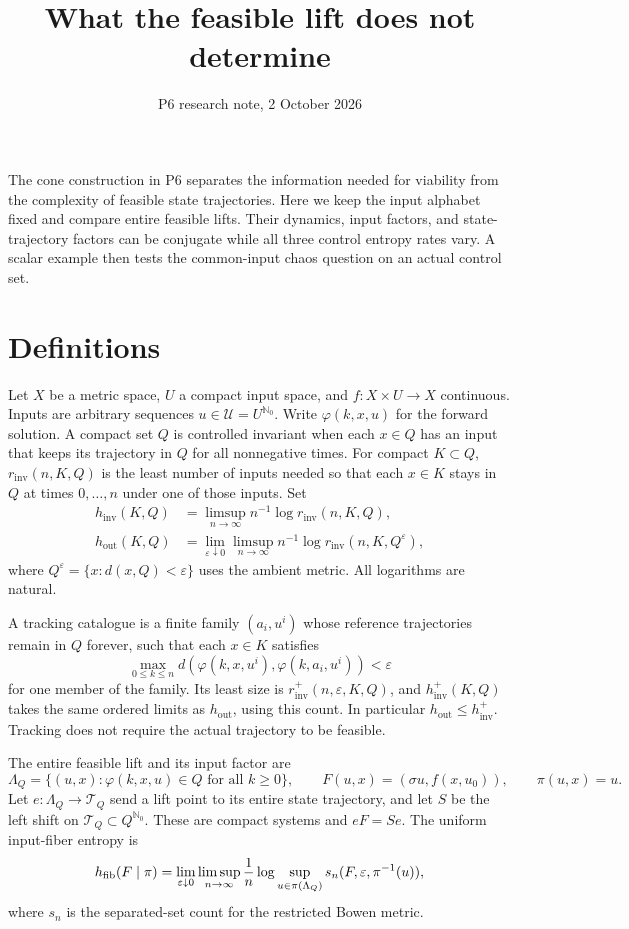 \documentclass[11pt,a4paper]{article}
\title{What the feasible lift does not determine}
\author{}
\date{P6 research note, 2 October 2026}
\theoremstyle{remark}
\newcommand{\U}{\mathcal U}
\newcommand{\T}{\mathcal T}
\newcommand{\hinv}{h_{\mathrm{inv}}}
\newcommand{\hout}{h_{\mathrm{out}}}
\newcommand{\htrack}{h_{\mathrm{inv}}^+}
\newcommand{\rinv}{r_{\mathrm{inv}}}
\begin{document}
\maketitle

The cone construction in P6 separates the information needed for viability
from the complexity of feasible state trajectories. Here we keep the input
alphabet fixed and compare entire feasible lifts. Their dynamics, input
factors, and state-trajectory factors can be conjugate while all three
control entropy rates vary. A scalar example then tests the common-input
chaos question on an actual control set.

\section{Definitions}

Let $X$ be a metric space, $U$ a compact input space, and
$f:X\times U\to X$ continuous. Inputs are arbitrary sequences
$u\in\U=U^{\mathbb N_0}$. Write $\varphi(k,x,u)$ for the forward solution.
A compact set $Q$ is controlled invariant when each $x\in Q$ has an input
that keeps its trajectory in $Q$ for all nonnegative times.
For compact $K\subset Q$, $\rinv(n,K,Q)$ is the least number of inputs
needed so that each $x\in K$ stays in $Q$ at times $0,\ldots,n$ under one
of those inputs. Set
\[
 \begin{aligned}
 \hinv(K,Q)&=\limsup_{n\to\infty}n^{-1}\log\rinv(n,K,Q),\\
 \hout(K,Q)&=\lim_{\varepsilon\downarrow0}\limsup_{n\to\infty}
       n^{-1}\log\rinv(n,K,Q^\varepsilon),
 \end{aligned}
\]
where $Q^\varepsilon=\{x:d(x,Q)<\varepsilon\}$ uses the ambient metric.
All logarithms are natural.

A tracking catalogue is a finite family $(a_i,u^i)$ whose reference
trajectories remain in $Q$ forever, such that each $x\in K$ satisfies
\[
 \max_{0\leq k\leq n}d(\varphi(k,x,u^i),\varphi(k,a_i,u^i))<\varepsilon
\]
for one member of the family. Its least size is
$\rinv^+(n,\varepsilon,K,Q)$, and $\htrack(K,Q)$ takes the same ordered
limits as $\hout$, using this count. In particular $\hout\leq\htrack$.
Tracking does not require the actual trajectory to be feasible.

The entire feasible lift and its input factor are
\[
 \Lambda_Q=\{(u,x):\varphi(k,x,u)\in Q\text{ for all }k\geq0\},\qquad
 F(u,x)=(\sigma u,f(x,u_0)),\qquad \pi(u,x)=u.
\]
Let $e:\Lambda_Q\to\T_Q$ send a lift point to its entire state trajectory,
and let $S$ be the left shift on $\T_Q\subset Q^{\mathbb N_0}$.
These are compact systems and $eF=Se$.
The uniform input-fiber entropy is
\[
 h_{\rm fib}(F\mid\pi)=\lim_{\varepsilon\downarrow0}\limsup_{n\to\infty}
 \frac1n\log\sup_{u\in\pi(\Lambda_Q)}s_n(F,\varepsilon,\pi^{-1}(u)),
\]
where $s_n$ is the separated-set count for the restricted Bowen metric.
\end{document}

